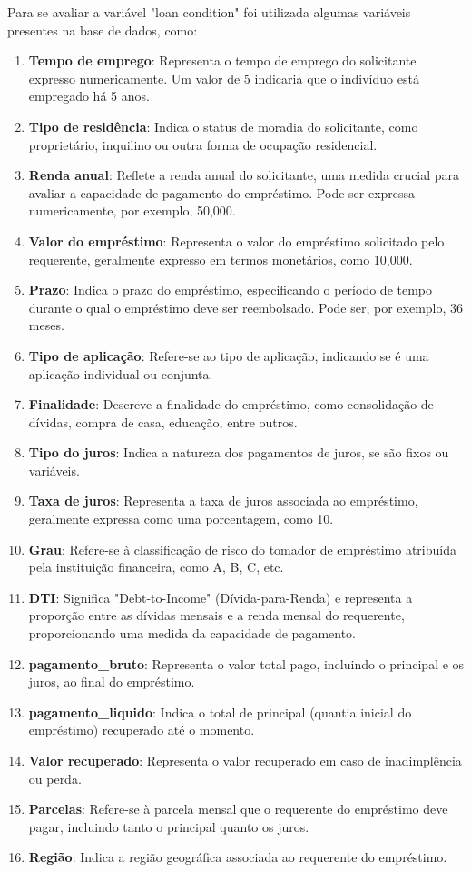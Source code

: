 Para se avaliar a variável "loan condition" foi utilizada algumas variáveis presentes na base de dados, como:

\begin{enumerate}
  \item \textbf{Tempo de emprego}: Representa o tempo de emprego do solicitante expresso numericamente. Um valor de 5 indicaria que o indivíduo está empregado há 5 anos.
  \item \textbf{Tipo de residência}: Indica o status de moradia do solicitante, como proprietário, inquilino ou outra forma de ocupação residencial.
  \item \textbf{Renda anual}: Reflete a renda anual do solicitante, uma medida crucial para avaliar a capacidade de pagamento do empréstimo. Pode ser expressa numericamente, por exemplo, 50,000.
  \item \textbf{Valor do empréstimo}: Representa o valor do empréstimo solicitado pelo requerente, geralmente expresso em termos monetários, como 10,000.
  \item \textbf{Prazo}: Indica o prazo do empréstimo, especificando o período de tempo durante o qual o empréstimo deve ser reembolsado. Pode ser, por exemplo, 36 meses.
  \item \textbf{Tipo de aplicação}: Refere-se ao tipo de aplicação, indicando se é uma aplicação individual ou conjunta.
  \item \textbf{Finalidade}: Descreve a finalidade do empréstimo, como consolidação de dívidas, compra de casa, educação, entre outros.
  \item \textbf{Tipo do juros}: Indica a natureza dos pagamentos de juros, se são fixos ou variáveis.
  \item \textbf{Taxa de juros}: Representa a taxa de juros associada ao empréstimo, geralmente expressa como uma porcentagem, como 10.
  \item \textbf{Grau}: Refere-se à classificação de risco do tomador de empréstimo atribuída pela instituição financeira, como A, B, C, etc.
  \item \textbf{DTI}: Significa "Debt-to-Income" (Dívida-para-Renda) e representa a proporção entre as dívidas mensais e a renda mensal do requerente, proporcionando uma medida da capacidade de pagamento.
  \item \textbf{pagamento\_bruto}: Representa o valor total pago, incluindo o principal e os juros, ao final do empréstimo.
  \item \textbf{pagamento\_liquido}: Indica o total de principal (quantia inicial do empréstimo) recuperado até o momento.
  \item \textbf{Valor recuperado}: Representa o valor recuperado em caso de inadimplência ou perda.
  \item \textbf{Parcelas}: Refere-se à parcela mensal que o requerente do empréstimo deve pagar, incluindo tanto o principal quanto os juros.
  \item \textbf{Região}: Indica a região geográfica associada ao requerente do empréstimo.
\end{enumerate}


